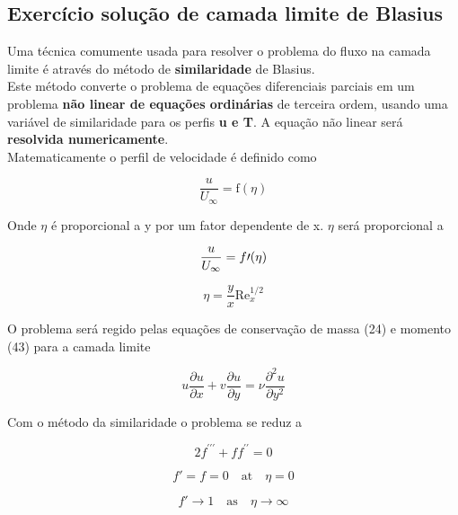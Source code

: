 \documentclass[12pt]{article}
\begin{document}
\subsection*{Exercício solução de camada limite de Blasius}

Uma técnica comumente usada para resolver o problema do fluxo na camada limite é através do método de \textbf{similaridade} de Blasius. \\
Este método converte o problema de equações diferenciais parciais em um problema \textbf{não linear de equações ordinárias} de terceira ordem, usando uma variável de similaridade para os perfis \textbf{u e T}. A equação não linear será \textbf{resolvida numericamente}.\\


Matematicamente o perfil de velocidade é definido como

\begin{equation}
	\frac{u}{U_\infty} = \text{f}(\eta)
\end{equation}

Onde $\eta$ é proporcional a y por um fator dependente de x. $\eta$ será proporcional a

\begin{equation}
	\frac{u}{U_\infty} = f\prime  (\eta) \\
\end{equation}

\begin{equation}
	\eta = \frac{y}{x} \text{Re}_x^{1/2}
\end{equation}

O problema será regido pelas equações de conservação de massa (24) e momento (43) para a camada limite

\begin{equation}
	u \frac{\partial u}{\partial x} + v \frac{\partial u}{\partial y} = \nu \frac{\partial^2 u}{\partial y^2}
\end{equation}

Com o método da similaridade o problema se reduz a

\begin{equation}
	2 f^{\prime\prime\prime} + f f^{\prime\prime} = 0
\end{equation}

\begin{equation}
	f' = f = 0 \quad \text{at} \quad \eta = 0
\end{equation}

\begin{equation}
	f' \to 1 \quad \text{as} \quad \eta \to \infty
\end{equation}
\end{document}
